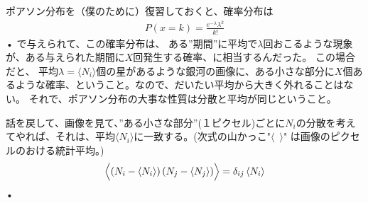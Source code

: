 \documentclass[11pt,a4paper,dvipdfmx]{jsarticle}
\theoremstyle{plain}
\theoremstyle{break}
\begin{document}
ポアソン分布を（僕のために）復習しておくと、確率分布は
\begin{align}
  P(x=k) = \frac{e^{-\lambda} \lambda^k}{k!}
\end{align}•%
で与えられて、この確率分布は、
ある”期間”に平均で$\lambda$回おこるような現象が、ある与えられた期間に$X$回発生する確率、に相当するんだった。
この場合だと、
平均$\lambda=\langle N_i\rangle$個の星があるような銀河の画像に、ある小さな部分に$X$個あるような確率、ということ。なので、だいたい平均から大きく外れることはない。
それで、ポアソン分布の大事な性質は分散と平均が同じということ。

話を戻して、画像を見て、”ある小さな部分”(１ピクセル)ごとに$N_i$の分散を考えてやれば、それは、平均$\langle N_i \rangle$に一致する。(次式の山かっこ"$\langle \,\,\, \rangle$" は画像のピクセルのおける統計平均。)
\begin{align}
  \Bigl\langle\left(N_{i}-\left\langle N_{i}\right\rangle\right)\left(N_{j}-\left\langle N_{j}\right\rangle\right)\Bigr\rangle
  =\delta_{i j}\left\langle N_{i}\right\rangle
\end{align}•%
\end{document}
